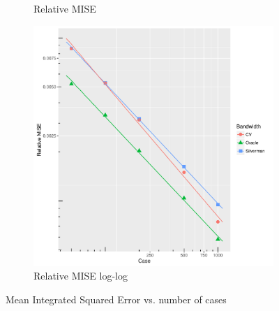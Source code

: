 \begin{figure}[htbp]
\begin{subfigure}[b]{0.3\textwidth}
    \caption{Relative MISE}
    \label{fig:ise:unif_NCases_1h:b}
    \end{subfigure}
    \begin{subfigure}[b]{0.3\textwidth}
    \includegraphics[width=\textwidth]{results/by_num_cases/RMISE-vs-cases-log-log}
    \caption{Relative MISE log-log}
    \label{fig:ise:unif_NCases_1h:c}
    \end{subfigure}
    \caption[MISE: by number of cases]{Mean Integrated Squared Error vs. number of cases}
    \label{fig:ise:unif_NCases_1h}
\end{figure}

